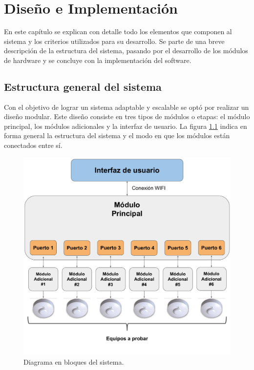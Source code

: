 \chapter{Diseño e Implementación} %

\label{Chapter3} %

En este capítulo se explican con detalle todo los elementos que componen al sistema y los criterios utilizados para su desarrollo. Se parte de una breve descripción de la estructura del sistema, pasando por el desarrollo de los módulos de hardware y se concluye con la implementación del software.


\section{Estructura general del sistema}
Con el objetivo de lograr un sistema adaptable y escalable se optó por realizar un diseño modular. Este diseño consiste en tres tipos de módulos o etapas: el módulo principal, los módulos adicionales y la interfaz de usuario. La figura \ref{fig:BloquesGral} indica en forma general la estructura del sistema y el modo en que los módulos están conectados entre sí.


\begin{figure}[ht]
	\centering
	\includegraphics[scale=0.5]{./Figures/BloquesGral.pdf}
	\caption{Diagrama en bloques del sistema.}
	\label{fig:BloquesGral}
\end{figure}

